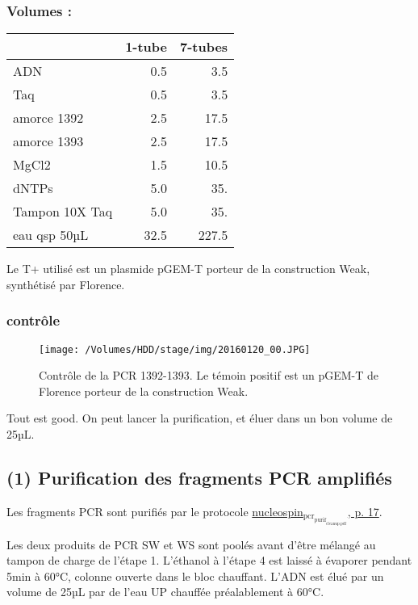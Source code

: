 \documentclass[9pt, oneside, twocolumn]{scrartcl}
\begin{document}
\subsubsection{Volumes :}
\label{sec:orgheadline60}
\begin{center}
\begin{tabular}{lrr}
\toprule
 & 1-tube & 7-tubes\\
\midrule
ADN & 0.5 & 3.5\\
Taq & 0.5 & 3.5\\
amorce 1392 & 2.5 & 17.5\\
amorce 1393 & 2.5 & 17.5\\
MgCl2 & 1.5 & 10.5\\
dNTPs & 5.0 & 35.\\
Tampon 10X Taq & 5.0 & 35.\\
\midrule
eau qsp 50µL & 32.5 & 227.5\\
\bottomrule
\end{tabular}
\end{center}

Le T+ utilisé est un plasmide pGEM-T porteur de la construction Weak, synthétisé
par Florence. 
\subsubsection{contrôle}
\label{sec:orgheadline61}
\begin{figure}[htb]
\centering
\texttt{[image: /Volumes/HDD/stage/img/20160120\_00.JPG]}
\caption{Contrôle de la PCR 1392-1393. Le témoin positif est un pGEM-T de Florence porteur de la construction Weak. }
\end{figure}

Tout est good. On peut lancer la purification, et éluer dans un bon volume de
25µL. 
\subsection{(1) Purification des fragments PCR amplifiés}
\label{sec:orgheadline64}
Les fragments PCR sont purifiés par le protocole
\href{///Users/samuelbarreto/Dropbox/Cours/Master/Semestre4/StageM2/doc/nucleospin_pcr_purif_cleanup.pdf::17}{nucleospin\(_{\text{pcr}}_{\text{purif}}_{\text{cleanup.pdf}}\), p. 17}. 

Les deux produits de PCR SW et WS sont poolés avant d'être mélangé au tampon de
charge de l'étape 1. L'éthanol à l'étape 4 est laissé à évaporer pendant 5min à
60°C, colonne ouverte dans le bloc chauffant. L'ADN est élué par un volume de
25µL par de l'eau UP chauffée préalablement à 60°C.
\end{document}
